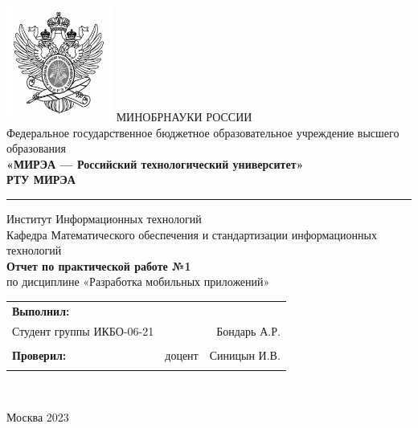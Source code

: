 \begin{center}
	\includegraphics[scale=0.5]{./res/logo} \break %
	\normalsize{МИНОБРНАУКИ РОССИИ}\\
	\normalsize{Федеральное государственное бюджетное образовательное учреждение высшего образования}\\
	\normalsize{\textbf{«МИРЭА --- Российский технологический университет»}}\\
	\large{\textbf{РТУ МИРЭА}}\\
	\bigskip \hrule \smallskip
	\normalsize{Институт Информационных технологий}\\
	\vfill
	\normalsize{Кафедра Математического обеспечения и стандартизации информационных технологий}\\
	\vfill
	\large{\textbf{Отчет по практической работе №1}}\\
	\normalsize{по дисциплине «Разработка мобильных приложений»}\\
	\vfill
	\vfill
	\normalsize{
		\begin{tabular}{lrr}
			\textbf{Выполнил:} & &\\
			Студент группы ИКБО-06-21 & & Бондарь А.Р. \\\\
			\textbf{Проверил:} &  доцент & Синицын И.В. \\\\
		\end{tabular}
	}\\
	\vfill
\end{center}

\begin{center} Москва 2023 \end{center}

\thispagestyle{empty}
